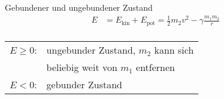 \begin{karte}{Gebundener und ungebundener Zustand}
    \begin{align*}
        E &= E_\text{kin} + E_\text{pot} = \frac{1}{2} m_2 v^2  - \gamma\frac{m_1  m_2}{r}\\
    \end{align*}
    \begin{tabular}[t]{cl}
        \(E \ge 0\): & ungebunder Zustand, \(m_2\) kann sich  \\
            & beliebig weit von \(m_1\) entfernen\\
        \(E < 0\): & gebunder Zustand
    \end{tabular}
\end{karte}
